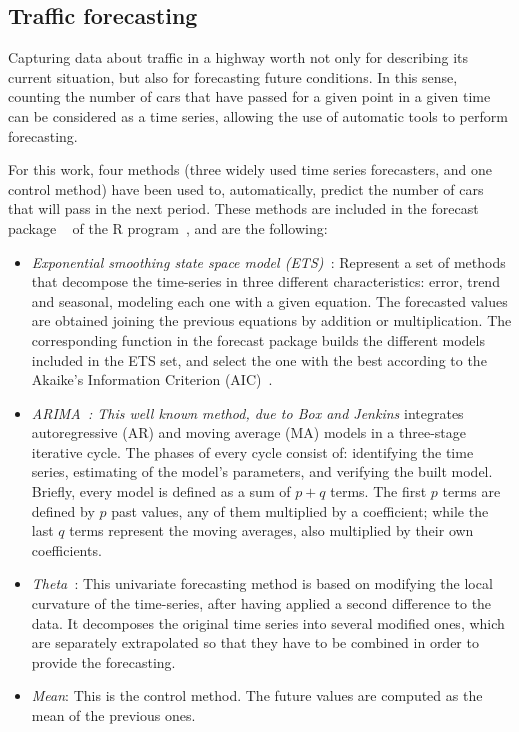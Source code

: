 \subsection{Traffic forecasting}
\label{sub:ts_forecasting}
Capturing data about traffic in a highway worth not only for describing its current situation, but also for forecasting future conditions. In this sense, counting the number of cars that have passed for a given point in a given time can be considered as a time series, allowing the use of automatic tools to perform forecasting.

For this work, four methods (three widely used time series forecasters, and one control method) have been used to, automatically, predict the number of cars that will pass in the next period. These methods are included in the forecast package ~\cite{Hyndman08automatictime} of the R program~\cite{R:Bloomfield:2014}, and are the following:

\begin{itemize}
\item {\em Exponential smoothing state space model (ETS)~\cite{ETS:2008}}: Represent a set of methods that decompose the time-series in three different characteristics: error, trend and seasonal, modeling each one with a given equation. The forecasted values are obtained joining the previous equations by addition or multiplication. The corresponding function in the forecast package builds the different models included in the ETS set, and select the one with the best according to the Akaike's Information Criterion (AIC)~\cite{Akaike1973}.
\item {\em ARIMA~\cite{BoxJenk}: This well known method, due to Box and Jenkins } integrates autoregressive (AR) and moving average (MA) models in a three-stage iterative cycle. The phases of every cycle consist of: identifying the time series, estimating of the model's parameters, and verifying the built model. Briefly, every model is defined as a sum of $p+q$ terms. The first $p$  terms are defined by $p$ past values, any of them multiplied by a coefficient; while the last $q$ terms represent the moving averages, also multiplied by their own coefficients.
\item {\em Theta~\cite{Assima2000}}: This univariate forecasting method is based on modifying the local curvature of the time-series, after having applied a second difference to the data. It decomposes the original time series into several modified ones, which are separately extrapolated so that they have to be combined in order to provide the forecasting.
\item {\em Mean}: This is the control method. The future values are computed as the mean of the previous ones.
\end{itemize}


